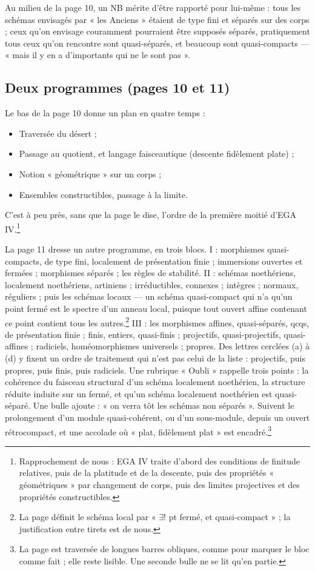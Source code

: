 \documentclass[11pt,a4paper]{article}
\begin{document}
Au milieu de la page 10, un NB mérite d'être rapporté pour lui-même : tous les
schémas envisagés par « les Anciens » étaient de type fini et séparés sur des
corps ; ceux qu'on envisage couramment pourraient être supposés séparés,
pratiquement tous ceux qu'on rencontre sont quasi-séparés, et beaucoup sont
quasi-compacts --- « mais il y en a d'importants qui ne le sont pas ».

\subsection*{Deux programmes (pages 10 et 11)}

Le bas de la page 10 donne un plan en quatre temps :

\begin{itemize}
  \item[a)] Traversée du désert ;
  \item[b)] Passage au quotient, et langage faisceautique (descente
  fidèlement plate) ;
  \item[c)] Notion « géométrique » sur un corps ;
  \item[d)] Ensembles constructibles, passage à la limite.
\end{itemize}

C'est à peu près, sans que la page le dise, l'ordre de la première moitié
d'EGA IV.\footnote{Rapprochement de nous : EGA IV traite d'abord des conditions
de finitude relatives, puis de la platitude et de la descente, puis des
propriétés « géométriques » par changement de corps, puis des limites
projectives et des propriétés constructibles.}

La page 11 dresse un autre programme, en trois blocs. I : morphismes
quasi-compacts, de type fini, localement de présentation finie ; immersions
ouvertes et fermées ; morphismes séparés ; les règles de stabilité. II :
schémas noethériens, localement noethériens, artiniens ; irréductibles,
connexes ; intègres ; normaux, réguliers ; puis les schémas locaux --- un
schéma quasi-compact qui n'a qu'un point fermé est le spectre d'un anneau
local, puisque tout ouvert affine contenant ce point contient tous les
autres.\footnote{La page définit le schéma local par « $\exists !$ pt fermé, et
quasi-compact » ; la justification entre tirets est de nous.} III : les
morphismes affines, quasi-séparés, qcqs, de présentation finie ; finis,
entiers, quasi-finis ; projectifs, quasi-projectifs, quasi-affines ; radiciels,
homéomorphismes universels ; propres. Des lettres cerclées (a) à (d) y fixent un
ordre de traitement qui n'est pas celui de la liste : projectifs, puis propres,
puis finis, puis radiciels. Une rubrique « Oubli » rappelle trois points : la
cohérence du faisceau structural d'un schéma localement noethérien, la
structure réduite induite sur un fermé, et qu'un schéma localement noethérien
est quasi-séparé. Une bulle ajoute : « on verra tôt les schémas non
séparés ». Suivent le prolongement d'un module quasi-cohérent, ou d'un
sous-module, depuis un ouvert rétrocompact, et une accolade où « plat,
fidèlement plat » est encadré.\footnote{La page est traversée de longues barres
obliques, comme pour marquer le bloc comme fait ; elle reste lisible. Une
seconde bulle ne se lit qu'en partie.}
\end{document}
